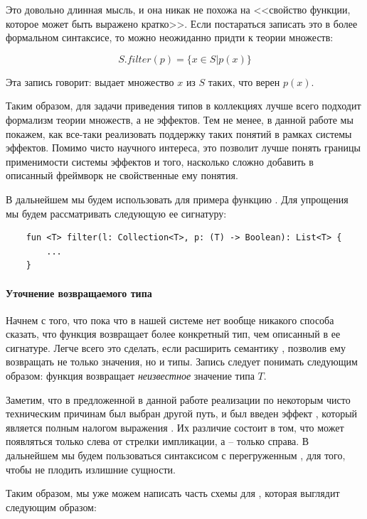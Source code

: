 Это довольно длинная мысль, и она никак не похожа на <<свойство функции, которое может быть выражено кратко>>. Если постараться записать это в более формальном синтаксисе, то можно неожиданно придти к теории множеств:

$$ S.filter(p) = \{ x \in S | p(x) \} $$

Эта запись говорит:  выдает множество $x$ из $S$ таких, что верен $p(x)$.

Таким образом, для задачи приведения типов в коллекциях лучше всего подходит формализм теории множеств, а не эффектов. Тем не менее, в данной работе мы покажем, как все-таки реализовать поддержку таких понятий в рамках системы эффектов. Помимо чисто научного интереса, это позволит лучше понять границы применимости системы эффектов и того, насколько сложно добавить в описанный фреймворк не свойственные ему понятия.

В дальнейшем мы будем использовать для примера функцию . Для упрощения мы будем рассматривать следующую ее сигнатуру:

\begin{verbatim}
	fun <T> filter(l: Collection<T>, p: (T) -> Boolean): List<T> {
		...
	}
\end{verbatim}

\paragraph{Уточнение возвращаемого типа}

Начнем с того, что пока что в нашей системе нет вообще никакого способа сказать, что функция возвращает более конкретный тип, чем описанный в ее сигнатуре. Легче всего это сделать, если расширить семантику , позволив ему возвращать не только значения, но и типы. Запись  следует понимать следующим образом: функция возвращает \emph{неизвестное} значение типа $T$.

Заметим, что в предложенной в данной работе реализации по некоторым чисто техническим причинам был выбран другой путь, и был введен эффект , который является полным налогом выражения . Их различие состоит в том, что  может появляться только слева от стрелки импликации, а  -- только справа. В дальнейшем мы будем пользоваться синтаксисом с перегруженным , для того, чтобы не плодить излишние сущности.

Таким образом, мы уже можем написать часть схемы для , которая выглядит следующим образом:

